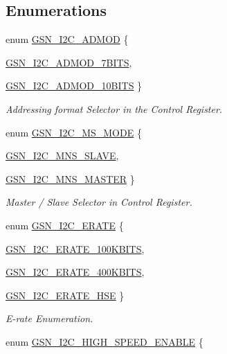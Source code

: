 \subsection*{Enumerations}
\begin{DoxyCompactItemize}
\item 
enum \hyperlink{a00649_gab1800d5ab13710494cd9a9e6eac6e0ab}{GSN\_\-I2C\_\-ADMOD} \{ \par
\hyperlink{a00649_ggab1800d5ab13710494cd9a9e6eac6e0abadc7f88f3cdf658094fc2e850fc32fa82}{GSN\_\-I2C\_\-ADMOD\_\-7BITS}, 
\par
\hyperlink{a00649_ggab1800d5ab13710494cd9a9e6eac6e0aba20b175316fa837d475e95cf6c4d95eb4}{GSN\_\-I2C\_\-ADMOD\_\-10BITS}
 \}
\begin{DoxyCompactList}\small\item\em Addressing format Selector in the Control Register. \end{DoxyCompactList}\item 
enum \hyperlink{a00649_ga56cbec3c8496c0e235150e2779966e47}{GSN\_\-I2C\_\-MS\_\-MODE} \{ \par
\hyperlink{a00649_gga56cbec3c8496c0e235150e2779966e47a983f57036fae304e43ce78f0a82488f7}{GSN\_\-I2C\_\-MNS\_\-SLAVE}, 
\par
\hyperlink{a00649_gga56cbec3c8496c0e235150e2779966e47a52d760f8c37219014a0387df086b95fe}{GSN\_\-I2C\_\-MNS\_\-MASTER}
 \}
\begin{DoxyCompactList}\small\item\em Master / Slave Selector in Control Register. \end{DoxyCompactList}\item 
enum \hyperlink{a00649_gaa477e3e9e89468cf508ed6ea99357639}{GSN\_\-I2C\_\-ERATE} \{ \par
\hyperlink{a00649_ggaa477e3e9e89468cf508ed6ea99357639af8b3beab06731f51024cdf139f59967d}{GSN\_\-I2C\_\-ERATE\_\-100KBITS}, 
\par
\hyperlink{a00649_ggaa477e3e9e89468cf508ed6ea99357639a64cb07eb5773970cf54700c4e0d46980}{GSN\_\-I2C\_\-ERATE\_\-400KBITS}, 
\par
\hyperlink{a00649_ggaa477e3e9e89468cf508ed6ea99357639a9faa845f0bff1187e45e6a87733554d3}{GSN\_\-I2C\_\-ERATE\_\-HSE}
 \}
\begin{DoxyCompactList}\small\item\em E-\/rate Enumeration. \end{DoxyCompactList}\item 
enum \hyperlink{a00649_ga75fb1bfd3b52d6ceab35ff62418c6bf6}{GSN\_\-I2C\_\-HIGH\_\-SPEED\_\-ENABLE} \{ \par

\end{DoxyCompactItemize}
